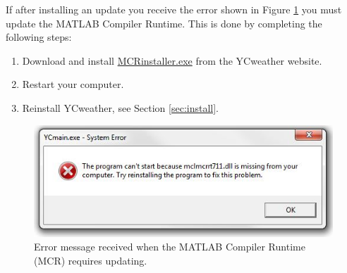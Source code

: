 If after installing an update you receive the error shown in Figure \ref{fig:MCRerror} you must update the MATLAB Compiler Runtime. This is done by completing the following steps:
\begin{enumerate}
	\item Download and install \href{http://www.coe.montana.edu/ce/subzero/snow/}{MCRinstaller.exe} from the YCweather website. 
	\item Restart your computer.
	\item Reinstall YCweather, see Section \ref{sec:install}.
\end{enumerate}

\begin{figure}[H]\centering
\includegraphics[width=0.66\linewidth]{figures/MCRerror.jpg}
\caption{Error message received when the MATLAB Compiler Runtime (MCR) requires updating.}
\label{fig:MCRerror}
\end{figure}
